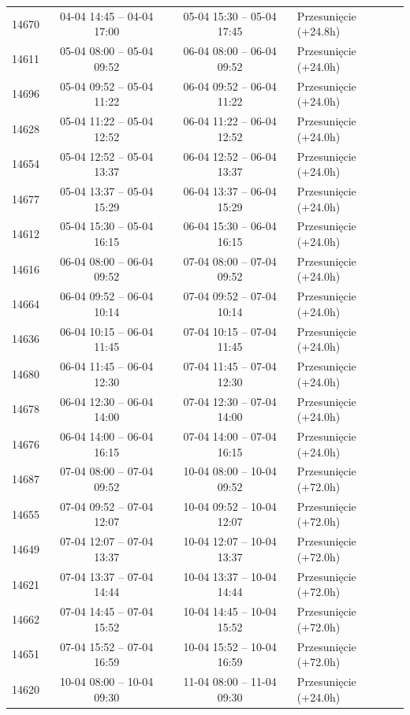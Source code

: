 \begin{table}[htbp]
\begin{tabular}{|r|c|c|l|}
14670 & 04-04 14:45 -- 04-04 17:00 & 05-04 15:30 -- 05-04 17:45 & Przesunięcie (+24.8h) \\ 
14611 & 05-04 08:00 -- 05-04 09:52 & 06-04 08:00 -- 06-04 09:52 & Przesunięcie (+24.0h) \\ 
14696 & 05-04 09:52 -- 05-04 11:22 & 06-04 09:52 -- 06-04 11:22 & Przesunięcie (+24.0h) \\ 
14628 & 05-04 11:22 -- 05-04 12:52 & 06-04 11:22 -- 06-04 12:52 & Przesunięcie (+24.0h) \\ 
14654 & 05-04 12:52 -- 05-04 13:37 & 06-04 12:52 -- 06-04 13:37 & Przesunięcie (+24.0h) \\ 
14677 & 05-04 13:37 -- 05-04 15:29 & 06-04 13:37 -- 06-04 15:29 & Przesunięcie (+24.0h) \\ 
14612 & 05-04 15:30 -- 05-04 16:15 & 06-04 15:30 -- 06-04 16:15 & Przesunięcie (+24.0h) \\ 
14616 & 06-04 08:00 -- 06-04 09:52 & 07-04 08:00 -- 07-04 09:52 & Przesunięcie (+24.0h) \\ 
14664 & 06-04 09:52 -- 06-04 10:14 & 07-04 09:52 -- 07-04 10:14 & Przesunięcie (+24.0h) \\ 
14636 & 06-04 10:15 -- 06-04 11:45 & 07-04 10:15 -- 07-04 11:45 & Przesunięcie (+24.0h) \\ 
14680 & 06-04 11:45 -- 06-04 12:30 & 07-04 11:45 -- 07-04 12:30 & Przesunięcie (+24.0h) \\ 
14678 & 06-04 12:30 -- 06-04 14:00 & 07-04 12:30 -- 07-04 14:00 & Przesunięcie (+24.0h) \\ 
14676 & 06-04 14:00 -- 06-04 16:15 & 07-04 14:00 -- 07-04 16:15 & Przesunięcie (+24.0h) \\ 
14687 & 07-04 08:00 -- 07-04 09:52 & 10-04 08:00 -- 10-04 09:52 & Przesunięcie (+72.0h) \\ 
14655 & 07-04 09:52 -- 07-04 12:07 & 10-04 09:52 -- 10-04 12:07 & Przesunięcie (+72.0h) \\ 
14649 & 07-04 12:07 -- 07-04 13:37 & 10-04 12:07 -- 10-04 13:37 & Przesunięcie (+72.0h) \\ 
14621 & 07-04 13:37 -- 07-04 14:44 & 10-04 13:37 -- 10-04 14:44 & Przesunięcie (+72.0h) \\ 
14662 & 07-04 14:45 -- 07-04 15:52 & 10-04 14:45 -- 10-04 15:52 & Przesunięcie (+72.0h) \\ 
14651 & 07-04 15:52 -- 07-04 16:59 & 10-04 15:52 -- 10-04 16:59 & Przesunięcie (+72.0h) \\ 
14620 & 10-04 08:00 -- 10-04 09:30 & 11-04 08:00 -- 11-04 09:30 & Przesunięcie (+24.0h) \\ 

\end{tabular}
\end{table}
